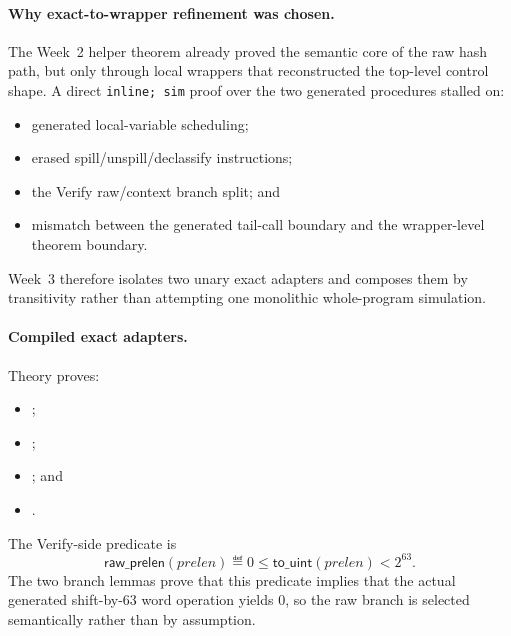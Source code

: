 \paragraph{Why exact-to-wrapper refinement was chosen.}
The Week~2 helper theorem already proved the semantic core of the raw hash
path, but only through local wrappers that reconstructed the top-level control
shape. A direct \texttt{inline; sim} proof over the two generated procedures
stalled on:
\begin{itemize}
  \item generated local-variable scheduling;
  \item erased spill/unspill/declassify instructions;
  \item the Verify raw/context branch split; and
  \item mismatch between the generated tail-call boundary and the wrapper-level
        theorem boundary.
\end{itemize}
Week~3 therefore isolates two unary exact adapters and composes them by
transitivity rather than attempting one monolithic whole-program simulation.

\paragraph{Compiled exact adapters.}
Theory  proves:
\begin{itemize}
  \item {};
  \item {};
  \item {}; and
  \item {}.
\end{itemize}
The Verify-side predicate is
\[
  \mathsf{raw\_prelen}(prelen)
  \eqdef
  0 \le \mathsf{to\_uint}(prelen) < 2^{63}.
\]
The two branch lemmas prove that this predicate implies that the actual
generated shift-by-63 word operation yields \(0\), so the raw branch is
selected semantically rather than by assumption.

